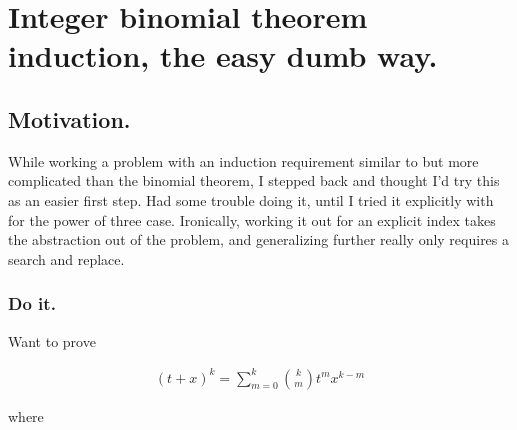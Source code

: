 
%
%




\chapter{Integer binomial theorem induction, the easy dumb way. }
\date{ March 26, 2009.  $RCSfile: binomial.tex,v $ Last $Revision: 1.8 $ $Date: 2009/06/11 17:00:37 $ }

%


\section{Motivation. }

While working a problem with an induction requirement similar to but more 
complicated than the binomial theorem, I stepped back and thought I'd try
this as an easier first step.  Had some trouble doing it, until I tried it
explicitly with for the power of three case.  Ironically, working it
out for an explicit index takes the abstraction out of the problem, and
generalizing further really only requires a search and replace.

\subsection{Do it. }

Want to prove

\begin{align}
(t + x)^k = \sum_{m=0}^k \binom{k}{m} t^m x^{k-m}
\end{align}

where

